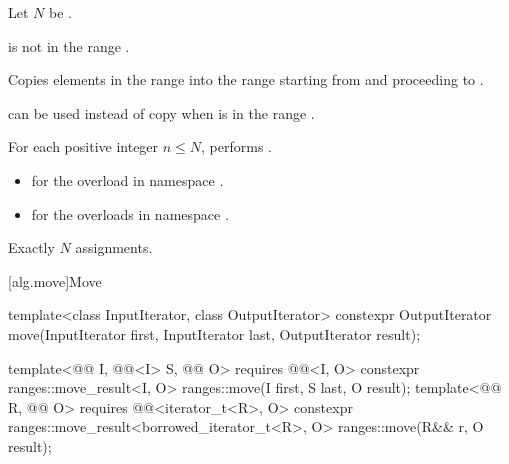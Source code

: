 \begin{itemdescr}
\pnum
Let $N$ be .

\pnum
\expects
{} is not in the range .

\pnum
\effects
Copies elements in the range 
into the range 
starting from  and proceeding to .
\begin{footnote}
 can be used instead of copy
when  is in the range .
\end{footnote}
For each positive integer $n \le N$,
performs .

\pnum
\returns
\begin{itemize}
\item
  for the overload in namespace .
\item
  for the overloads in namespace .
\end{itemize}

\pnum
\complexity
Exactly $N$ assignments.
\end{itemdescr}

[alg.move]{Move}

%
\begin{itemdecl}
template<class InputIterator, class OutputIterator>
  constexpr OutputIterator move(InputIterator first, InputIterator last,
                                OutputIterator result);

template<@@ I, @@<I> S, @@ O>
  requires @@<I, O>
  constexpr ranges::move_result<I, O>
    ranges::move(I first, S last, O result);
template<@@ R, @@ O>
  requires @@<iterator_t<R>, O>
  constexpr ranges::move_result<borrowed_iterator_t<R>, O>
    ranges::move(R&& r, O result);
\end{itemdecl}

